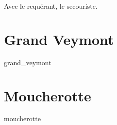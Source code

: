 \chaptertoc{}


Avec  le requérant,  le secouriste.

\section{Grand Veymont}
\label{anx:retrans_grand_veymont}
{grand_veymont}

\section{Moucherotte}
\label{anx:retrans_moucherotte}
{moucherotte}









